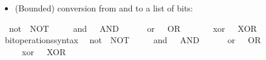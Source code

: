 \begin{isabellebody}
\begin{isamarkuptext}
\begin{itemize}
\begin{itemize}
\item (Bounded) conversion from and to a list of bits: %
\end{itemize}%
\end{itemize}%
\end{isamarkuptext}\isamarkuptrue%
\isamarkupfalse%
\isanewline
\ \ not\ \ {\isacharparenleft}{\kern0pt}{\isacartoucheopen}NOT{\isacartoucheclose}{\isacharparenright}{\kern0pt}\isanewline
\ \ \ \ \ {\isachardoublequoteopen}and{\isachardoublequoteclose}\ \ {\isacharparenleft}{\kern0pt}\ {\isacartoucheopen}AND{\isacartoucheclose}\ {}{}{\isacharparenright}{\kern0pt}\isanewline
\ \ \ \ \ or\ \ {\isacharparenleft}{\kern0pt}\ {\isacartoucheopen}OR{\isacartoucheclose}\ \ {}{}{\isacharparenright}{\kern0pt}\isanewline
\ \ \ \ \ xor\ \ {\isacharparenleft}{\kern0pt}\ {\isacartoucheopen}XOR{\isacartoucheclose}\ {}{}{\isacharparenright}{\kern0pt}\isanewline
\isanewline
{}\isamarkupfalse%
\ bit{\isacharunderscore}{\kern0pt}operations{\isacharunderscore}{\kern0pt}syntax\isanewline
{}\isanewline
\isanewline
{}\isamarkupfalse%
\isanewline
\ \ not\ \ {\isacharparenleft}{\kern0pt}{\isacartoucheopen}NOT{\isacartoucheclose}{\isacharparenright}{\kern0pt}\isanewline
\ \ \ \ \ {\isachardoublequoteopen}and{\isachardoublequoteclose}\ \ {\isacharparenleft}{\kern0pt}\ {\isacartoucheopen}AND{\isacartoucheclose}\ {}{}{\isacharparenright}{\kern0pt}\isanewline
\ \ \ \ \ or\ \ {\isacharparenleft}{\kern0pt}\ {\isacartoucheopen}OR{\isacartoucheclose}\ \ {}{}{\isacharparenright}{\kern0pt}\isanewline
\ \ \ \ \ xor\ \ {\isacharparenleft}{\kern0pt}\ {\isacartoucheopen}XOR{\isacartoucheclose}\ {}{}{\isacharparenright}{\kern0pt}\isanewline
\isanewline
{}\isamarkupfalse%
\isanewline
%
\isadelimtheory
\isanewline
%
\endisadelimtheory
%
\isatagtheory
{}\isamarkupfalse%
%
\endisatagtheory
{\isafoldtheory}%
%
\isadelimtheory
%
\endisadelimtheory
%
\end{isabellebody}%
